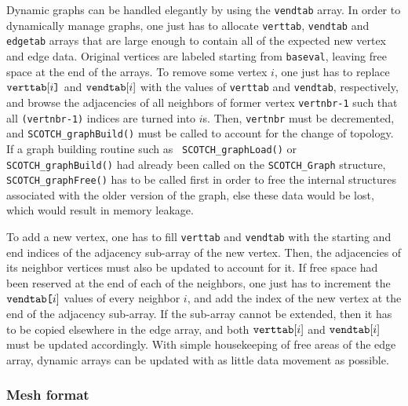 Dynamic graphs can be handled elegantly by using the {\tt vendtab}
array. In order to dynamically manage graphs, one just has to allocate
{\tt verttab}, {\tt vendtab} and {\tt edgetab} arrays that are large
enough to contain all of the expected new vertex and edge
data. Original vertices are labeled starting from {\tt baseval},
leaving free space at the end of the arrays. To remove some vertex
$i$, one just has to replace ${\tt verttab}\mathtt{[}i\mbox{\tt
]}$ and ${\tt vendtab}\mathtt{[}i\mathtt{]}$ with the values of
{\tt verttab} and {\tt vendtab}, respectively, and browse the adjacencies of all neighbors of
former vertex {\tt vertnbr-1} such that all {\tt (vertnbr-1)} indices
are turned into $i$s. Then, {\tt vertnbr} must be decremented, and
{\tt SCOTCH\_\lbt graphBuild()} must be called to account for the
change of topology. If a graph building routine such as {\tt
SCOTCH\_\lbt graph\lbt Load()} or {\tt SCOTCH\_\lbt graph\lbt Build()}
had already been called on the {\tt SCOTCH\_\lbt Graph} structure,
{\tt SCOTCH\_\lbt graph\lbt Free()} has to be called first in order to
free the internal structures associated with the older version of the
graph, else these data would be lost, which would result in memory
leakage.

To add a new vertex, one has to fill {\tt verttab} and {\tt vendtab} with the starting and end
indices of the adjacency sub-array of the new vertex. Then, the
adjacencies of its neighbor vertices must also be updated to account
for it. If free space had been reserved at the end of each of the
neighbors, one just has to increment the ${\tt vendtab}\mbox{\tt
[}i\mathtt{]}$ values of every neighbor $i$, and add the index of
the new vertex at the end of the adjacency sub-array. If the sub-array
cannot be extended, then it has to be copied elsewhere in the edge
array, and both ${\tt verttab}\mathtt{[}i\mathtt{]}$ and ${\tt
vendtab}\mathtt{[}i\mathtt{]}$ must be updated accordingly. With
simple housekeeping of free areas of the edge array, dynamic arrays
can be updated with as little data movement as possible.

\subsubsection{Mesh format}
\label{sec-lib-format-mesh}

